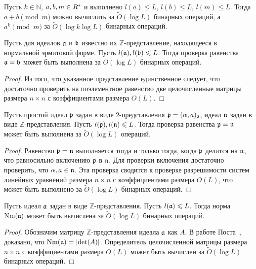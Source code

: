 \documentclass[_00_dissertation.tex]{subfiles}
\begin{document}
\begin{corollary}\label{corollary:mod}
    Пусть $k \in \mathbb{N}$, $a, b, m \in R^{*}$ и выполнено $l(a) \leq L$, $l(b) \leq L$, $l(m) \leq L$.
    Тогда $a + b \pmod{m}$ можно вычислить за $\tilde{O}(\log L)$ бинарных операций, а $a^k \pmod{m}$ за $\tilde{O}(\log k \log L)$ бинарных операций.
\end{corollary}

\begin{proposition}\label{proposition:equality}
    Пусть для идеалов $\mathfrak{a}$ и $\mathfrak{b}$ известно их $\mathbb{Z}$-представление, находящееся в нормальной эрмитовой форме.
    Пусть $l(\mathfrak{a}), l(\mathfrak{b}) \leqslant L$.
    Тогда проверка равенства $\mathfrak{a} = \mathfrak{b}$ может быть выполнена за $O(\log L)$ бинарных операций.
\end{proposition}
\begin{proof}
    Из того, что указанное представление единственное следует, что достаточно проверить на поэлементное равенство две целочисленные матрицы размера $n \times n$ с коэффициентами размера $O(L)$.
\end{proof}

\begin{proposition}\label{proposition:particular_equality}
    Пусть простой идеал $\mathfrak{p}$ задан в виде 2-представления $\mathfrak{p} = (\alpha, a)_2$, идеал $\mathfrak{n}$ задан в виде $\mathbb{Z}$-представления.
    Пусть $l(\mathfrak{p}), l(\mathfrak{n}) \leqslant L$.
    Тогда проверка равенства $\mathfrak{p} = \mathfrak{n}$ может быть выполнена за $\tilde{O}(\log L)$ операций.
\end{proposition}
\begin{proof}
    Равенство $\mathfrak{p} = \mathfrak{n}$ выполняется тогда и только тогда, когда $\mathfrak{p}$ делится на $\mathfrak{n}$, что равносильно включению $\mathfrak{p}$ в $\mathfrak{n}$.
    Для проверки включения достаточно проверить, что $\alpha, a \in \mathfrak{n}$.
    Эта проверка сводится к проверке разрешимости систем линейных уравнений размера $n \times n$ с коэффициентами размера $O(L)$, что может быть выполнено за $\tilde{O}(\log L)$ бинарных операций.
\end{proof}

\begin{proposition}\label{proposition:norm}
    Пусть идеал $\mathfrak{a}$ задан в виде $\mathbb{Z}$-представления.
    Пусть $l(\mathfrak{a}) \leqslant L$.
    Тогда норма $\textrm{Nm}(\mathfrak{a})$ может быть вычислена за $\tilde{O}(\log L)$ бинарных операций.
\end{proposition}
\begin{proof}
    Обозначим матрицу $\mathbb{Z}$-представления идеала $\mathfrak{a}$ как $A$.
    В работе Поста~\cite[с.~61]{source:Pohst}, доказано, что $\textrm{Nm}(\mathfrak{a}) = |\mathrm{det}(A)|$.
    Определитель целочисленной матрицы размера $n \times n$ с коэффициентами размера $O(L)$ может быть вычислен за $\tilde{O}(\log L)$ бинарных операций.
\end{proof}
\end{document}
